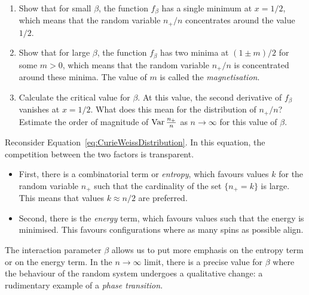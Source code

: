 \begin{exercise}~
    \begin{enumerate}[label=(\roman*)]
        \item Show that for small $\beta$, the function \( f_{\beta} \) has a single
            minimum at $x=1/2$, which means that the random variable \( n_+/n \)
            concentrates around the value \( 1/2 \).
        \item Show that for large $\beta$, the function \( f_{\beta} \) has two minima at
            \( (1 \pm m)/2 \) for some $m>0$, which means that the random variable \(
            n_+/n \) is concentrated around these minima.
            The value of $m$ is called the \emph{magnetisation}.
        \item Calculate the critical value for $\beta$. At this value, the second
            derivative of \( f_{\beta} \) vanishes at \( x=1/2 \). What does this mean
            for the distribution of \( n_+/n \)?
            Estimate the order of magnitude of $\operatorname{Var}\frac{n_+}{n}$ as $n\to\infty$ for
            this value of $\beta$.
    \end{enumerate}
\end{exercise}

\begin{remark}
    Reconsider Equation~\eqref{eq:CurieWeissDistribution}.
    In this equation, the competition between the two factors is transparent.
    \begin{itemize}
        \item     First, there is a combinatorial term or \emph{entropy}, which favours
            values $k$ for the random variable
            $n_+$ such that the cardinality of the set $\{n_+=k\}$ is large.
            This means that values $k\approx n/2$ are preferred.
        \item     Second, there is the \emph{energy} term, which favours values such that the energy
            is minimised. This favours configurations where as many spins as possible align.
    \end{itemize}
    The interaction parameter $\beta$ allows us to put more emphasis
    on the entropy term or on the energy term.
    In the $n\to\infty$ limit, there is a precise value for $\beta$
    where the behaviour of the random system undergoes a qualitative change:
    a rudimentary example of a \emph{phase transition}.
\end{remark}

